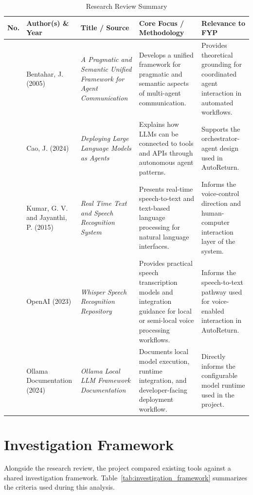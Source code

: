 \begin{table}[!htbp]
\centering
\small
\renewcommand{\arraystretch}{1.15}
\setlength{\tabcolsep}{4pt}
\begin{tabularx}{\textwidth}{|>{\raggedright\arraybackslash}p{0.7cm}|>{\raggedright\arraybackslash}p{2.0cm}|>{\raggedright\arraybackslash}p{3.0cm}|>{\raggedright\arraybackslash}X|>{\raggedright\arraybackslash}X|}
\hline
\textbf{No.} & \textbf{Author(s) \& Year} & \textbf{Title / Source} & \textbf{Core Focus / Methodology} & \textbf{Relevance to FYP} \\ \hline
1 & Bentahar, J. (2005) & \textit{A Pragmatic and Semantic Unified Framework for Agent Communication} & Develops a unified framework for pragmatic and semantic aspects of multi-agent communication. & Provides theoretical grounding for coordinated agent interaction in automated workflows. \\ \hline
2 & Cao, J. (2024) & \textit{Deploying Large Language Models as Agents} & Explains how LLMs can be connected to tools and APIs through autonomous agent patterns. & Supports the orchestrator-agent design used in AutoReturn. \\ \hline
3 & Kumar, G. V. and Jayanthi, P. (2015) & \textit{Real Time Text and Speech Recognition System} & Presents real-time speech-to-text and text-based language processing for natural language interfaces. & Informs the voice-control direction and human-computer interaction layer of the system. \\ \hline
4 & OpenAI (2023) & \textit{Whisper Speech Recognition Repository} & Provides practical speech transcription models and integration guidance for local or semi-local voice processing workflows. & Informs the speech-to-text pathway used for voice-enabled interaction in AutoReturn. \\ \hline
5 & Ollama Documentation (2024) & \textit{Ollama Local LLM Framework Documentation} & Documents local model execution, runtime integration, and developer-facing deployment workflow. & Directly informs the configurable model runtime used in the project. \\ \hline
\end{tabularx}
\caption{Research Review Summary}
\label{tab:research_review_summary}
\end{table}
\FloatBarrier

\section{Investigation Framework}
Alongside the research review, the project compared existing tools against a shared investigation framework. Table~\ref{tab:investigation_framework} summarizes the criteria used during this analysis.

